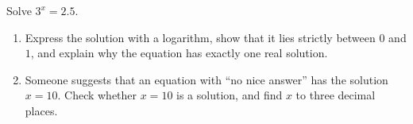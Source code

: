 Solve $3^x=2.5$.
\begin{enumerate}
\item[(a)] Express the solution with a logarithm, show that it lies strictly between $0$ and $1$, and explain why the equation has exactly one real solution.
\item[(b)] Someone suggests that an equation with ``no nice answer'' has the solution $x=10$. Check whether $x=10$ is a solution, and find $x$ to three decimal places.
\end{enumerate}
